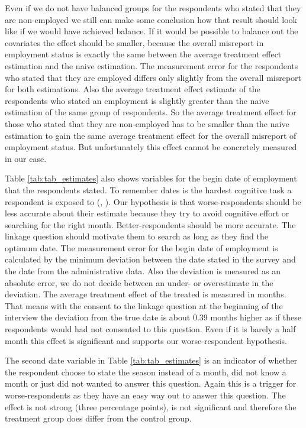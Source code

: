 Even if we do not have balanced groups for the respondents who stated that they are non-employed we still can make some conclusion how that result should look like if we would have achieved balance. If it would be possible to balance out the covariates the effect should be smaller, because the overall misreport in employment status is exactly the same between the average treatment effect estimation and the naive estimation. The measurement error for the respondents who stated that they are employed differs only slightly from the overall misreport for both estimations. Also the average treatment effect estimate of the respondents who stated an employment is slightly greater than the naive estimation of the same group of respondents. So the average treatment effect for those who stated that they are non-employed has to be smaller than the naive estimation to gain the same average treatment effect for the overall misreport of employment status. But unfortunately this effect cannot be concretely measured in our case.

Table \ref{tab:tab_estimates} also shows variables for the begin date of employment that the respondents stated. To remember dates is the hardest cognitive task a respondent is exposed to (\cite{Wagenaar86}, \cite{Friedmann93}). Our hypothesis is that worse-respondents should be less accurate about their estimate because they try to avoid cognitive effort or searching for the right month. Better-respondents should be more accurate. The linkage question should motivate them to search as long as they find the optimum date. The measurement error for the begin date of employment is calculated by the minimum deviation between the date stated in the survey and the date from the administrative data. Also the deviation is measured as an absolute error, we do not decide between an under- or overestimate in the deviation. The average treatment effect of the treated is measured in months. That means with the consent to the linkage question at the beginning of the interview the deviation from the true date is about 0.39 months higher as if these respondents would had not consented to this question. Even if it is barely a half month this effect is significant and supports our worse-respondent hypothesis.

The second date variable in Table \ref{tab:tab_estimates} is an indicator of whether the respondent choose to state the season instead of a month, did not know a month or just did not wanted to answer this question. Again this is a trigger for worse-respondents as they have an easy way out to answer this question. The effect is not strong (three percentage points), is not significant and therefore the treatment group does differ from the control group.

